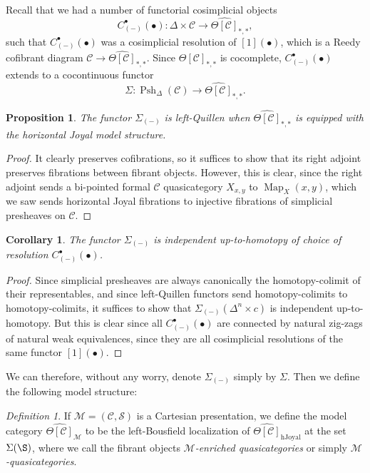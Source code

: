 \documentclass{amsart}
\numberwithin{equation}{section}
\theoremstyle{plain}   %
\newtheorem{prop}[subsection]{Proposition}
\newtheorem{cor}[subsection]{Corollary}
\theoremstyle{remark}
\newtheorem{defn}[subsection]{Definition}
\theoremstyle{plain}
\DeclareMathOperator{\Psh}{Psh}
\DeclareMathOperator{\Map}{Map}
\newcommand{\C}{\ensuremath{\mathcal{C}}}
\newcommand{\M}{\ensuremath{\mathcal{M}}}
\newcommand{\setS}{\ensuremath{\mathscr{S}}}
\newcommand{\cellset}{\ensuremath{\widehat{\Theta[\mathcal{C}]}}}
\begin{document}
Recall that we had a number of functorial cosimplicial objects \[C_{(-)}^\bullet(\bullet):\Delta \times \C \to \cellset_{\ast,\ast},\] such that \(C_{(-)}^\bullet(\bullet)\) was a cosimplicial resolution of \([1](\bullet)\), which is a Reedy cofibrant diagram \(\C\to \cellset_{\ast,\ast}\).  Since \(\cellset_{\ast,\ast}\) is cocomplete, \(C_{(-)}^\bullet(\bullet)\) extends to a cocontinuous functor \[\Sigma:\Psh_\Delta(\C)\to \cellset_{\ast,\ast}.\]  

\begin{prop} The functor \(\Sigma_{(-)}\) is left-Quillen when \(\cellset_{\ast,\ast}\) is equipped with the horizontal Joyal model structure.
\end{prop}
\begin{proof} 
  It clearly preserves cofibrations, so it suffices to show that its right adjoint preserves fibrations between fibrant objects.  However, this is clear, since the right adjoint sends a bi-pointed formal \(\C\) quasicategory \(X_{x,y}\) to \(\Map_X(x,y)\), which we saw sends horizontal Joyal fibrations to injective fibrations of simplicial presheaves on \(\C\).
\end{proof}
\begin{cor}
  The functor \(\Sigma_{(-)}\) is independent up-to-homotopy of choice of resolution \(C_{(-)}^\bullet(\bullet)\).
\end{cor}
\begin{proof}
  Since simplicial presheaves are always canonically the homotopy-colimit of their representables, and since left-Quillen functors send homotopy-colimits to homotopy-colimits, it suffices to show that \(\Sigma_{(-)}(\Delta^n\times c)\) is independent up-to-homotopy.  But this is clear since all \(C_{(-)}^\bullet(\bullet)\) are connected by natural zig-zags of natural weak equivalences, since they are all cosimplicial resolutions of the same functor \([1](\bullet)\).
\end{proof}
We can therefore, without any worry, denote \(\Sigma_{(-)}\) simply by \(\Sigma\).  Then we define the following model structure:
\begin{defn}
  If \(\M=(\C,\setS)\) is a Cartesian presentation, we define the model category \(\cellset_{\M}\) to be the left-Bousfield localization of \(\cellset_\mathrm{hJoyal}\) at the set \(\Sigma(\S)\), where we call the fibrant objects \emph{\(\M\)-enriched quasicategories} or simply \emph{\(\M\)-quasicategories}.
\end{defn}
\end{document}
